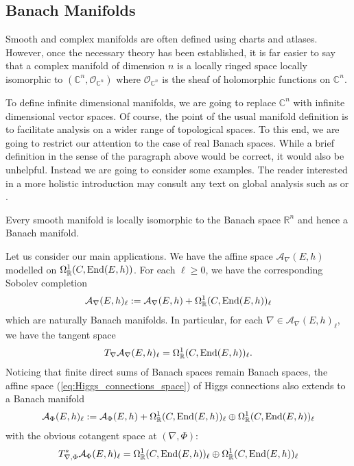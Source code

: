 \documentclass[12pt]{ociamthesis}  %
\begin{document}
\subsection{Banach Manifolds}

Smooth and complex manifolds are often defined using charts and
atlases. However, once the necessary theory has been established,
it is far easier to say that a complex manifold
of dimension $n$ is a locally ringed space locally isomorphic to
$(\mathbb{C}^n,\mathcal O_{\mathbb{C}^n})$ where
$\mathcal O_{\mathbb{C}^n}$ is the sheaf of holomorphic functions on
$\mathbb{C}^n$.

To define infinite dimensional manifolds, we are going to replace
$\mathbb{C}^n$ with infinite dimensional vector spaces. Of course,
the point of the usual manifold definition is to facilitate analysis
on a wider range of topological spaces. To this end, we are going to
restrict our attention to the case of real Banach spaces. While a brief
definition in the sense of the paragraph above would be correct,
it would also be unhelpful. Instead we are going to consider some
examples. The reader interested in a more holistic
introduction may consult any text on global analysis such
as \cite[Chapter 7]{kahn1982} or \cite{bc2009}.

\begin{example}
  Every smooth manifold is locally isomorphic to
  the Banach space $\mathbb R^n$ and hence a Banach manifold.
\end{example}

\begin{example}
  Let us consider our main applications. We have the affine space
  $\mathcal A_\nabla(E,h)$ modelled on $\Omega^1_{\mathbb{R}}(C,\operatorname{End}(E,h))$.
  For each $\ell \geq 0$, we have the corresponding Sobolev completion
  \begin{align*}
    \mathcal A_\nabla(E,h)_\ell := \mathcal A_\nabla(E,h) + \Omega^1_{\mathbb{R}}(C,\operatorname{End}(E,h))_\ell
  \end{align*}
  which are naturally Banach manifolds.
  In particular, for each $\nabla\in \mathcal A_\nabla(E,h)_\ell$, we have the
  tangent space
  \begin{align*}
    T_\nabla \mathcal A_\nabla(E,h)_\ell
    = \Omega^1_{\mathbb{R}}(C,\operatorname{End}(E,h))_\ell.
  \end{align*}
  Noticing that finite direct sums of Banach spaces remain Banach spaces,
  the affine space (\ref{eq:Higgs_connections_space}) of Higgs connections also
  extends to a Banach manifold
  \begin{align*}
    \mathcal A_\Phi(E,h)_\ell := \mathcal A_\Phi(E,h) + \Omega^1_{\mathbb{R}}(C,\operatorname{End}(E,h))_\ell
    \oplus \Omega^1_{\mathbb{R}}(C,\operatorname{End}(E,h))_\ell
  \end{align*}
  with the obvious cotangent space at $(\nabla,\Phi)$:
  \begin{align*}
    T^*_{\nabla,\Phi} \mathcal A_\Phi(E,h)_\ell
    = \Omega^1_{\mathbb{R}}(C,\operatorname{End}(E,h))_\ell
    \oplus \Omega^1_{\mathbb{R}}(C,\operatorname{End}(E,h))_\ell
  \end{align*}
\end{example}
\end{document}
